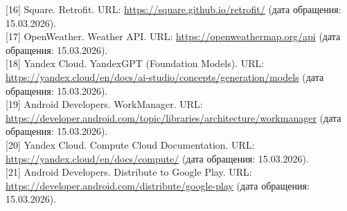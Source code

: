 \noindent \hypertarget{src:16}{}[16] Square. Retrofit. URL: \url{https://square.github.io/retrofit/} (дата обращения: 15.03.2026).\\
\noindent \hypertarget{src:17}{}[17] OpenWeather. Weather API. URL: \url{https://openweathermap.org/api} (дата обращения: 15.03.2026).\\
\noindent \hypertarget{src:18}{}[18] Yandex Cloud. YandexGPT (Foundation Models). URL: \url{https://yandex.cloud/en/docs/ai-studio/concepts/generation/models} (дата обращения: 15.03.2026).\\
\noindent \hypertarget{src:19}{}[19] Android Developers. WorkManager. URL: \url{https://developer.android.com/topic/libraries/architecture/workmanager} (дата обращения: 15.03.2026).\\
\noindent \hypertarget{src:20}{}[20] Yandex Cloud. Compute Cloud Documentation. URL: \url{https://yandex.cloud/en/docs/compute/} (дата обращения: 15.03.2026).\\
\noindent \hypertarget{src:21}{}[21] Android Developers. Distribute to Google Play. URL: \url{https://developer.android.com/distribute/google-play} (дата обращения: 15.03.2026).
